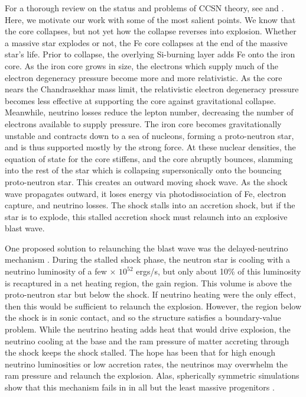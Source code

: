 \documentclass[twocolumn]{aastex6}
\begin{document}
For a thorough review on the status and problems of CCSN theory, see \citet{muller17} and \citet{janka16}.  Here, we motivate our work with some of the most salient points.
We know that the core collapses, but not yet how the collapse reverses into explosion.
Whether a massive star explodes or not, the Fe core collapses
at the end of the massive star's life.
Prior to collapse, the overlying Si-burning layer adds Fe onto the iron core.  As the iron core grows in
size, the electrons which supply much of the electron degeneracy pressure
become more and more relativistic.  As the core nears the Chandrasekhar mass limit, the
relativistic electron degeneracy pressure becomes less effective at
supporting the core against gravitational collapse.  Meanwhile,
neutrino losses reduce the lepton number, decreasing the number of
electrons available to supply pressure.  The iron
core becomes gravitationally unstable and contracts down to a sea of nucleons, forming a proto-neutron
star, and is thus supported mostly by the strong force. At these nuclear densities, the equation of state for
  the core stiffens, and the core abruptly bounces, slamming into the
  rest of the star which is collapsing supersonically onto the
  bouncing proto-neutron star.  This creates
  an outward moving shock wave.   As the shock wave propagates outward, it loses
  energy via photodissociation of Fe, electron capture, and
neutrino losses. The shock stalls into an accretion shock, but
if the star is to explode, this stalled accretion shock must relaunch
into an explosive blast wave.

One proposed solution to relaunching the blast wave was the
delayed-neutrino mechanism \citep{bethe85}. During the stalled
  shock phase, the neutron star is cooling with a neutrino
  luminosity of a few $\times$ $10^{52}$ ergs/s, but only about 10\% of this
  luminosity is recaptured in a net heating region, the gain region. This volume is above the proto-neutron star but below the shock.  If neutrino heating were the only effect, then this would be sufficient to relaunch the explosion.  However, the region below the shock is
  in sonic contact, and so the structure satisfies a boundary-value
  problem.  While the neutrino heating adds heat that would drive
  explosion, the neutrino cooling at the base and the ram pressure of
  matter accreting through the shock keeps the shock stalled.  The
  hope has been that for high enough neutrino luminosities or low
  accretion rates, the neutrinos may overwhelm the ram pressure and
  relaunch the explosion.  Alas, spherically symmetric simulations show that this mechanism
fails in in all but the least massive progenitors \citep{liebendorfer01a,liebendorfer01b,liebendorfer05b,rampp02,buras03,thompson03,kitaura06,buras06b,muller17b,radice17}.  
 
\end{document}
